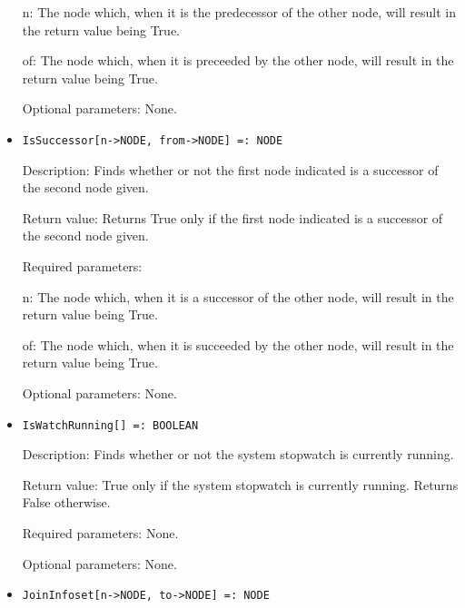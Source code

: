 \begin{itemize}
\bd
\item
[ n:] The node which, when it is the predecessor of the other node,
will result in the return value being True.
\item
[ of:] The node which, when it is preceeded by the other node, will
result in the return value being True.
\ed

\item
[Optional parameters:] None.
\ed

\item
\protect \large \begin{verbatim}
IsSuccessor[n->NODE, from->NODE] =: NODE
\end{verbatim}\normalsize

\bd
\item
[Description:] Finds whether or not the first node indicated is a 
successor of the second node given.
\item
[Return value:] Returns True only if the first node indicated is a successor of the second node given.
\item
[Required parameters:]\hfil\null
	
\bd
\item
[ n:] The node which, when it is a successor of the other node, will
result in the return value being True.
\item
[ of:] The node which, when it is succeeded by the other node, will
result in the return value being True.
\ed

\item
[Optional parameters:] None.
\ed

\item
\protect \large \begin{verbatim}
IsWatchRunning[] =: BOOLEAN
\end{verbatim}\normalsize

\bd
\item
[Description:] Finds whether or not the system stopwatch is currently
running.
\item
[Return value:] True only if the system stopwatch is currently running.
Returns False otherwise.
\item
[Required parameters:] None.
\item
[Optional parameters:] None.
\ed

\item
\protect \large \begin{verbatim}
JoinInfoset[n->NODE, to->NODE] =: NODE
\end{verbatim}\normalsize


\end{itemize}
